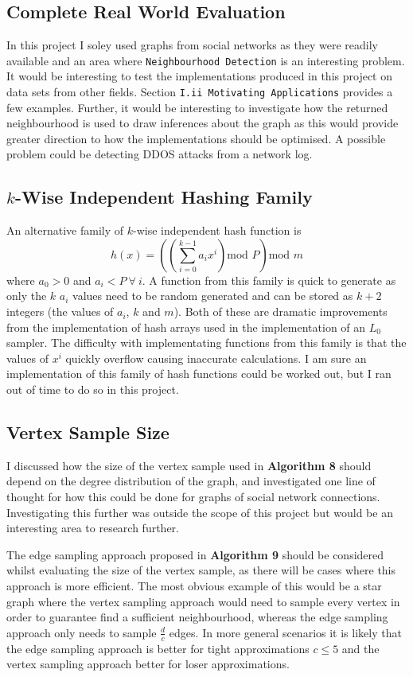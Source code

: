 \documentclass[11pt,twoside,a4paper]{report}
\begin{document}
\subsection*{Complete Real World Evaluation}
In this project I soley used graphs from social networks as they were readily available and an area where \texttt{Neighbourhood Detection} is an interesting problem. It would be interesting to test the implementations produced in this project on data sets from other fields. Section \texttt{I.ii Motivating Applications} provides a few examples. Further, it would be interesting to investigate how the returned neighbourhood is used to draw inferences about the graph as this would provide greater direction to how the implementations should be optimised. A possible problem could be detecting DDOS attacks from a network log.

\subsection*{$k$-Wise Independent Hashing Family}
An alternative family of $k$-wise independent hash function is
$${\displaystyle h(x)=\left(\left(\sum_{i=0}^{k-1}a_ix^i\right)\text{mod }P\right)\text{mod }m}$$
where $a_0>0$ and $a_i<P\ \forall\ i$. A function from this family is quick to generate as only the $k$ $a_i$ values need to be random generated and can be stored as $k+2$ integers (the values of $a_i$, $k$ and $m$). Both of these are dramatic improvements from the implementation of hash arrays used in the implementation of an $L_0$ sampler. The difficulty with implementating functions from this family is that the values of $x^i$ quickly overflow causing inaccurate calculations. I am sure an implementation of this family of hash functions could be worked out, but I ran out of time to do so in this project.

\subsection*{Vertex Sample Size}
I discussed how the size of the vertex sample used in \textbf{Algorithm 8} should depend on the degree distribution of the graph, and investigated one line of thought for how this could be done for graphs of social network connections. Investigating this further was outside the scope of this project but would be an interesting area to research further.
\par The edge sampling approach proposed in \textbf{Algorithm 9} should be considered whilst evaluating the size of the vertex sample, as there will be cases where this approach is more efficient. The most obvious example of this would be a star graph where the vertex sampling approach would need to sample every vertex in order to guarantee find a sufficient neighbourhood, whereas the edge sampling approach only needs to sample $\frac{d}c$ edges. In more general scenarios it is likely that the edge sampling approach is better for tight approximations $c\leq5$ and the vertex sampling approach better for loser approximations.
\end{document}
